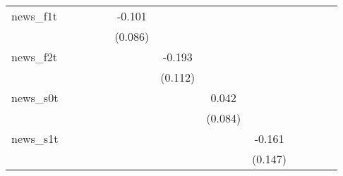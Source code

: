 {\begin{tabular}{l*{12}{c}}
\addlinespace
news\_f1t    &                     &                     &                     &                     &      -0.101         &                     &                     &                     &                     &                     &                     &                     \\
            &                     &                     &                     &                     &     (0.086)         &                     &                     &                     &                     &                     &                     &                     \\
\addlinespace
news\_f2t    &                     &                     &                     &                     &                     &      -0.193\sym{*}  &                     &                     &                     &                     &                     &                     \\
            &                     &                     &                     &                     &                     &     (0.112)         &                     &                     &                     &                     &                     &                     \\
\addlinespace
news\_s0t    &                     &                     &                     &                     &                     &                     &       0.042         &                     &                     &                     &                     &                     \\
            &                     &                     &                     &                     &                     &                     &     (0.084)         &                     &                     &                     &                     &                     \\
\addlinespace
news\_s1t    &                     &                     &                     &                     &                     &                     &                     &      -0.161         &                     &                     &                     &                     \\
            &                     &                     &                     &                     &                     &                     &                     &     (0.147)         &                     &                     &                     &                     \\

\end{tabular}}

